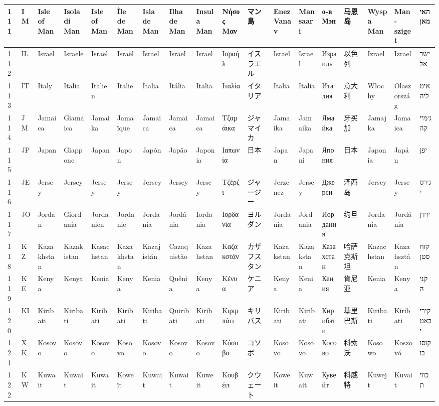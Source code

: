 \begin{longtable}{|l|l|l|l|l|l|l|l|l|l|l|l|l|l|l|l|l|l|}
111 & IM & Isle of Man & Isola di Man & Isle of Man & Île de Man & Isla de Man & Ilha de Man & Insula Man & Νήσος Μαν & マン島 & Enez Vanav & Mansaari & о-в Мэн & 马恩岛 & Wyspa Man & Man-sziget & האי מאן \\ \hline 
112 & IL & Israel & Israele & Israel & Israël & Israel & Israel & Israel & Ισραήλ & イスラエル & Israel & Israel & Израиль & 以色列 & Izrael & Izrael & ישראל \\ \hline 
113 & IT & Italy & Italia & Italien & Italie & Italia & Itália & Italia & Ιταλία & イタリア & Italia & Italia & Италия & 意大利 & Włochy & Olaszország & איטליה \\ \hline 
114 & JM & Jamaica & Giamaica & Jamaika & Jamaïque & Jamaica & Jamaica & Jamaica & Τζαμάικα & ジャマイカ & Jamaika & Jamaika & Ямайка & 牙买加 & Jamajka & Jamaica & ג׳מייקה \\ \hline 
115 & JP & Japan & Giappone & Japan & Japon & Japón & Japão & Japonia & Ιαπωνία & 日本 & Japan & Japani & Япония & 日本 & Japonia & Japán & יפן \\ \hline 
116 & JE & Jersey & Jersey & Jersey & Jersey & Jersey & Jersey & Jersey & Τζέρζι & ジャージー & Jerzenez & Jersey & Джерси & 泽西岛 & Jersey & Jersey & ג׳רסי \\ \hline 
117 & JO & Jordan & Giordania & Jordanien & Jordanie & Jordania & Jordânia & Iordania & Ιορδανία & ヨルダン & Jordania & Jordania & Иордания & 约旦 & Jordania & Jordánia & ירדן \\ \hline 
118 & KZ & Kazakhstan & Kazakistan & Kasachstan & Kazakhstan & Kazajistán & Cazaquistão & Kazahstan & Καζακστάν & カザフスタン & Kazakstan & Kazakstan & Казахстан & 哈萨克斯坦 & Kazachstan & Kazahsztán & קזחסטן \\ \hline 
119 & KE & Kenya & Kenya & Kenia & Kenya & Kenia & Quênia & Kenya & Κένυα & ケニア & Kenya & Kenia & Кения & 肯尼亚 & Kenia & Kenya & קניה \\ \hline 
120 & KI & Kiribati & Kiribati & Kiribati & Kiribati & Kiribati & Quiribati & Kiribati & Κιριμπάτι & キリバス & Kiribati & Kiribati & Кирибати & 基里巴斯 & Kiribati & Kiribati & קיריבאטי \\ \hline 
121 & XK & Kosovo & Kosovo & Kosovo & Kosovo & Kosovo & Kosovo & Kosovo & Κόσοβο & コソボ & Kosovo & Kosovo & Косово & 科索沃 & Kosowo & Koszovó & קוסובו \\ \hline 
122 & KW & Kuwait & Kuwait & Kuwait & Koweït & Kuwait & Kuwait & Kuweit & Κουβέιτ & クウェート & Koweit & Kuwait & Кувейт & 科威特 & Kuwejt & Kuvait & כווית \\ \hline 

\end{longtable}

